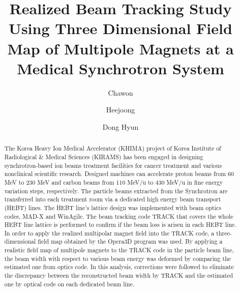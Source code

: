 \documentclass[jkps,preprint,fleqn,showpacs,showkeys]{revtex4}
\begin{document}
\setcounter{page}{1}
\title[]{Realized Beam Tracking Study Using Three Dimensional Field Map of Multipole Magnets at a Medical Synchrotron System}
\author{Chawon }
\author{Heejoong }
\author{Dong Hyun }
\begin{abstract}
  The Korea Heavy Ion Medical Accelerator (KHIMA) project of Korea Institute of Radiological \& Medical Sciences (KIRAMS) has been engaged in
  designing synchrotron-based ion beams treatment facilities for cancer treatment and various nonclinical scientific research.
  Designed machines can accelerate proton beams from 60 MeV to 230 MeV
  and carbon beams from 110 MeV/u to 430 MeV/u in fine energy variation steps, respectively.
  The particle beams extracted from the Synchrotron are transferred into each treatment room via a dedicated high energy beam transport (HEBT) lines.
  The HEBT line's lattice design was implemented with beam optics codes, MAD-X and WinAgile.  
  The beam tracking code TRACK that covers the whole HEBT line lattice is performed to confirm if the beam loss is arisen in each HEBT line.  
  In order to apply the realized multipolar magnet field into the TRACK code, a three-dimensional field map obtained by the Opera3D program was used.
  By applying a realistic field map of multipole magnets to the TRACK code in the particle beam line,  
  the beam width with respect to various beam energy was deformed by comparing the estimated one from optics code.
  In this analysis, corrections were followed to eliminate the discrepancy between the reconstructed beam width by TRACK
  and the estimated one by optical code on each dedicated beam line.
\end{abstract}
\end{document}
